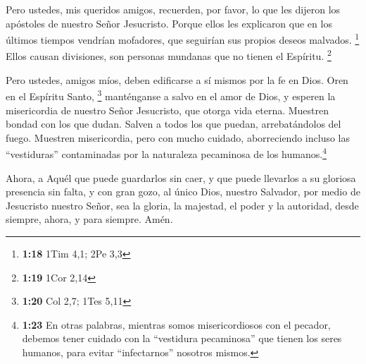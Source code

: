  Pero ustedes, mis queridos amigos, recuerden, por favor,
lo que les dijeron los apóstoles de nuestro Señor Jesucristo.
 Porque ellos les explicaron que en los últimos tiempos
vendrían mofadores, que seguirían sus propios deseos malvados.
\footnote{\textbf{1:18} 1Tim 4,1; 2Pe 3,3}  Ellos causan
divisiones, son personas mundanas que no tienen el Espíritu. \footnote{\textbf{1:19}
  1Cor 2,14}

 Pero ustedes, amigos míos, deben edificarse a sí mismos
por la fe en Dios. Oren en el Espíritu Santo, \footnote{\textbf{1:20}
  Col 2,7; 1Tes 5,11}  manténganse a salvo en el amor de
Dios, y esperen la misericordia de nuestro Señor Jesucristo, que otorga
vida eterna.  Muestren bondad con los que dudan.
 Salven a todos los que puedan, arrebatándolos del fuego.
Muestren misericordia, pero con mucho cuidado, aborreciendo incluso las
``vestiduras'' contaminadas por la naturaleza pecaminosa de los
humanos.\footnote{\textbf{1:23} En otras palabras, mientras somos
  misericordiosos con el pecador, debemos tener cuidado con la
  ``vestidura pecaminosa'' que tienen los seres humanos, para evitar
  ``infectarnos'' nosotros mismos.}

 Ahora, a Aquél que puede guardarlos sin caer, y que
puede llevarlos a su gloriosa presencia sin falta, y con gran gozo,
 al único Dios, nuestro Salvador, por medio de Jesucristo
nuestro Señor, sea la gloria, la majestad, el poder y la autoridad,
desde siempre, ahora, y para siempre. Amén.
